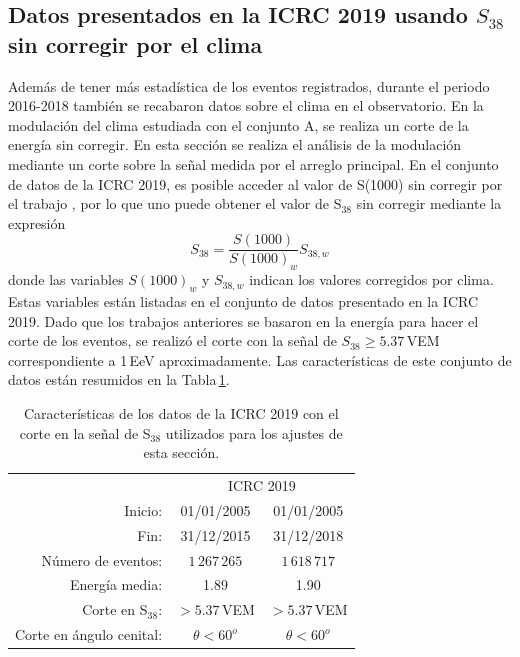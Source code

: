 \subsection{Datos presentados en la ICRC 2019 usando $S_{38}$ sin corregir por el clima} \label{sin_corregir_s38}

Además de tener más estadística de los eventos registrados, durante el periodo 2016-2018 también se recabaron datos sobre el clima en el observatorio. En la modulación del clima estudiada con el conjunto A, se  realiza un corte de la energía sin corregir. En esta sección se realiza el análisis de la modulación mediante un  corte sobre la señal medida por el arreglo principal. En el conjunto de datos de la ICRC 2019, es posible acceder al valor de S(1000) sin corregir por el trabajo \cite{aab2017impact}, por lo que uno puede obtener el valor de S$_{38}$ sin corregir mediante la expresión
\begin{equation}
S_{38} = \frac{S(1000)}{S(1000)_w}S_{38,w}
\label{eq:s38_w}
\end{equation}
donde las variables $S(1000)_w$ y $S_{38,w}$ indican los valores corregidos por clima. Estas variables están listadas en el conjunto de datos presentado en la ICRC 2019. Dado que los trabajos anteriores se basaron en la energía para hacer el corte de los eventos, se realizó el corte con la señal de $S_{38}\ge 5.37\,$VEM correspondiente a 1\,EeV aproximadamente. Las características de este conjunto de datos están resumidos en la Tabla\,\ref{tabla:caracteristicas_ICRC_2019_S38}.
   \begin{table}[H]
       \centering
       \begin{tabular}{r|c|c|}
    \cline{2-3}
                              & \multicolumn{2}{c|}{ICRC 2019} \\ \cline{2-3}
 
       Inicio:                 & 01/01/2005                 &  01/01/2005 \\
       Fin:                    & 31/12/2015                 &   31/12/2018 \\
       Número de eventos:       &   $1\,267\,265$     	    &  $1\,618\,717$     		\\ 
       Energía media:           &  1.89        		 	    &  1.90        		\\  
       Corte en S$_{38}$: 	   &  $>5.37$\,VEM   		 	    &  $>5.37$\,VEM       	\\  
       Corte en ángulo cenital: &  $\theta<60^o$ 			 	 & $\theta<60^o$\\ \cline{2-3}
       \end{tabular}
       \caption{Características de los datos de la ICRC 2019 con el corte en la señal de S$_{38}$ utilizados para los ajustes de esta sección.} \label{tabla:caracteristicas_ICRC_2019_S38}
   \end{table}
   
